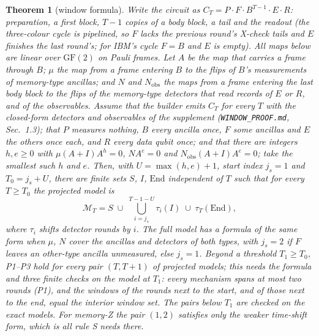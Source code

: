 \documentclass[aps,pra,twocolumn,superscriptaddress,nofootinbib,longbibliography,floatfix]{revtex4-2}
\newtheorem{theorem}{Theorem}
\newcommand{\GF}{\mathrm{GF}(2)}
\begin{document}
\begin{theorem}[window formula]
\label{thm:window}
Write the circuit as $C_T=P\cdot F\cdot B^{T-1}\cdot E\cdot R$: preparation, a first block, $T-1$ copies of a body block, a tail and the readout (the three-colour cycle is pipelined, so $F$ lacks the previous round's X-check tails and $E$ finishes the last round's; for IBM's cycle $F=B$ and $E$ is empty). All maps below are linear over $\GF$ on Pauli frames. Let $A$ be the map that carries a frame through $B$; $\mu$ the map from a frame entering $B$ to the flips of $B$'s measurements of memory-type ancillas; and $N$ and $N_{\mathrm{obs}}$ the maps from a frame entering the last body block to the flips of the memory-type detectors that read records of $E$ or $R$, and of the observables. Assume that the builder emits $C_T$ for every $T$ with the closed-form detectors and observables of the supplement (\texttt{WINDOW\_PROOF.md}, Sec.~1.3); that $P$ measures nothing, $B$ every ancilla once, $F$ some ancillas and $E$ the others once each, and $R$ every data qubit once; and that there are integers $h,e\ge0$ with $\mu(A+I)A^{h}=0$, $NA^{e}=0$ and $N_{\mathrm{obs}}(A+I)A^{e}=0$; take the smallest such $h$ and $e$. Then, with $U=\max(h,e)+1$, start index $j_s=1$ and $T_0=j_s+U$, there are finite sets $S$, $I$, $\mathrm{End}$ independent of $T$ such that for every $T\ge T_0$ the projected model is
\[
\mathcal M_T=S\;\cup\;\bigcup_{i=j_s}^{T-1-U}\tau_i(I)\;\cup\;\tau_T(\mathrm{End}),
\]
where $\tau_i$ shifts detector rounds by $i$. The full model has a formula of the same form when $\mu$, $N$ cover the ancillas and detectors of both types, with $j_s=2$ if $F$ leaves an other-type ancilla unmeasured, else $j_s=1$. Beyond a threshold $T_1\ge T_0$, P1--P3 hold for every pair $(T,T+1)$ of projected models; this needs the formula and three finite checks on the model at $T_1$: every mechanism spans at most two rounds (P1), and the windows of the rounds next to the start, and of those next to the end, equal the interior window set. The pairs below $T_1$ are checked on the exact models. For memory-Z the pair $(1,2)$ satisfies only the weaker time-shift form, which is all rule S needs there.
\end{theorem}
\end{document}
